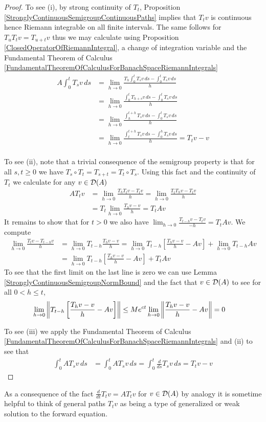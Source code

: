 \begin{proof}
To see (i), by strong continuity of $T_t$, Proposition \ref{StronglyContinuousSemigroupContinuousPaths} implies  that $T_tv$ is continuous hence Riemann integrable on all finite intervals.  The same follows for $T_u T_t v = T_{u+t}v$ thus we may calculate using Proposition \ref{ClosedOperatorOfRiemannIntegral}, a change of integration variable and the Fundamental Theorem of Calculus \ref{FundamentalTheoremOfCalculusForBanachSpaceRiemannIntegrals}
\begin{align*}
A \int_0^t T_sv \, ds &= \lim_{h \to 0}  \frac{T_h \int_0^t T_sv \, ds - \int_0^t T_sv \, ds}{h} \\
&= \lim_{h \to 0}  \frac{\int_0^t T_{h+s} v \, ds - \int_0^t T_sv \, ds}{h} \\
&= \lim_{h \to 0}  \frac{\int_h^{t+h} T_{s} v \, ds - \int_0^t T_sv \, ds}{h} \\
&= \lim_{h \to 0}  \frac{\int_t^{t+h} T_{s} v \, ds - \int_0^h T_sv \, ds}{h} = T_t v - v\\
\end{align*}

To see (ii), note that a trivial consequence of the semigroup property is that for all $s,t \geq 0$ we have $T_s \circ T_t = T_{s+t} = T_t \circ T_s$.  Using this fact and
the continuity of $T_t$ we calculate for any $v \in \mathcal{D}(A)$ 
\begin{align*}
A T_t v &= \lim_{h \to 0} \frac{T_h T_t v - T_t v}{h} =\lim_{h \to 0} \frac{T_t T_h v - T_t v}{h} \\
&= T_t \lim_{h \to 0} \frac{T_h v - v}{h} = T_t A v
\end{align*}
It remains to show that for $t > 0$ we also have $\lim_{h \to 0} \frac{T_{t-h} v - T_t v}{-h} = T_t A v$.  
We compute
\begin{align*}
\lim_{h \to 0} \frac{T_t v - T_{t-h} v}{h} &= \lim_{h \to 0} T_{t-h} \frac{T_h v - v}{h} 
= \lim_{h \to 0} T_{t-h} \left[\frac{T_h v - v}{h} -Av\right] + \lim_{h \to 0} T_{t-h} Av \\
&=\lim_{h \to 0} T_{t-h} \left[\frac{T_h v - v}{h} -Av\right] + T_t Av
\end{align*}
To see that the first limit on the last line is zero we can use Lemma \ref{StronglyContinuousSemigroupNormBound} and the fact that $v \in \mathcal{D}(A)$ to see for all $0 < h \leq t$,
\begin{align*}
\lim_{h \to 0} \left \lVert T_{t-h} \left[\frac{T_h v - v}{h} -Av\right] \right \rVert &\leq M e^{ct} \lim_{h \to 0} \left \lVert \frac{T_h v - v}{h} -Av \right \rVert = 0
\end{align*}

To see (iii) we apply the Fundamental Theorem of Calculus \ref{FundamentalTheoremOfCalculusForBanachSpaceRiemannIntegrals} and (ii) to see that
\begin{align*}
\int_0^t A T_s v \, ds &= \int_0^t A T_s v \, ds = \int_0^t \frac{d}{ds} T_s v \, ds = T_t v - v
\end{align*}
\end{proof}
As a consequence of the fact $\frac{d}{dt} T_t v = A T_t v$ for $v \in \mathcal{D}(A)$ by analogy it is sometime helpful to think of general paths $T_t v$ as being a type of generalized or weak solution to the forward equation.

